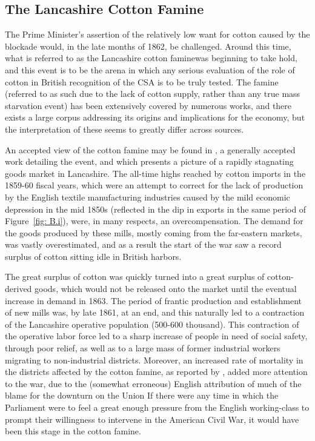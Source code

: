 \subsection{The Lancashire Cotton Famine}
The Prime Minister's assertion of the relatively low want for cotton caused by the blockade would, in the late months of 1862, be challenged. Around this time,
what is referred to as the \flq Lancashire cotton famine\frq was beginning to take hold, and this event is to be the arena in which any serious evaluation
of the role of cotton in British recognition of the CSA is to be truly tested. The famine (referred to as such due to the lack of cotton supply, rather than 
any true mass starvation event) has been extensively covered by numerous works, and there exists a large corpus addressing its origins and 
implications for the economy, but the interpretation of these seems to greatly differ across sources. 

An accepted view of the cotton famine may be found in , a generally accepted work detailing the event, and which 
presents a picture of a rapidly stagnating goods market in Lancashire\autocite[78]{arnoldHistoryCotton1864}. The all-time highs reached by cotton imports 
in the 1859-60 fiscal years, which were an attempt to correct for the lack of production by the English textile manufacturing industries caused by the 
mild economic depression in the mid 1850s (reflected in the dip in exports in the same period of Figure~\ref{fig: B.i}), were, in many respects, an 
overcompensation. The demand for the goods produced by these mills, mostly coming from the far-eastern markets, was vastly overestimated, and as a result 
the start of the war saw a record surplus of cotton sitting idle in British harbors. 

The great surplus of cotton was quickly turned into a great surplus of cotton-derived goods, which would not be released onto the market until the 
eventual increase in demand in 1863. The period of frantic production and establishment of new mills was, by late 1861, at an end, and this naturally led to
a contraction of the Lancashire operative population (500-600 thousand\autocite[Vol.II, p.13]{adamsBritainAmericanWar1925}). This contraction of the 
operative labor force led to a sharp increase of people in need of social safety, through \flq poor relief\frq\autocite[Vol.II, p.12]{adamsBritainAmericanWar1925},
as well as to a large mass of former industrial workers migrating to non-industrial districts\autocite{arthi2022recessions}. Moreover, an increased rate of
mortality in the districts affected by the cotton famine, as reported by , added more attention to the war, due to the 
(somewhat erroneous) English attribution of much of the blame for the downturn on the Union\autocite[229]{arnoldHistoryCotton1864} \textemdash
If there were any time in which the Parliament were to feel a great enough pressure from the English working-class to prompt their willingness to intervene in the American Civil War, 
it would have been this stage in the cotton famine.

